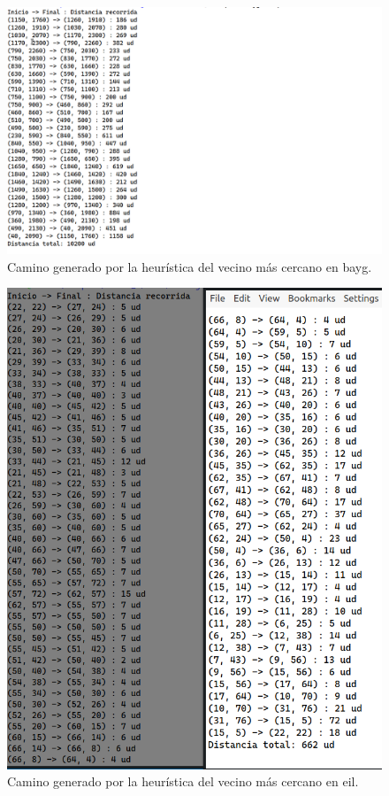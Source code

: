 \begin{figure}[H]
  \centering
  \includegraphics[scale=0.7]{img/dist-vecinos-bayg.png}
  \caption{Camino generado por la heurística del vecino más cercano en bayg.}
\end{figure}

\begin{figure}[H] 
  \centering
  \includegraphics[scale=0.5]{img/dist-vecinos-eil.png}
  \caption{Camino generado por la heurística del vecino más cercano en eil.}
\end{figure}

